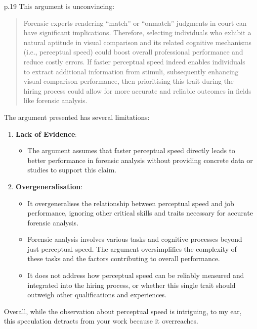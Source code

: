\documentclass[
  single column]{article}
\providecommand{\tightlist}{%
  \setlength{\itemsep}{0pt}\setlength{\parskip}{0pt}}\usepackage{longtable,booktabs,array}
\begin{document}
p.19 This argument is unconvincing:

\begin{quote}
Forensic experts rendering ``match'' or ``onmatch'' judgments in court
can have significant implications. Therefore, selecting individuals who
exhibit a natural aptitude in visual comparison and its related
cognitive mechanisms (i.e., perceptual speed) could boost overall
professional performance and reduce costly errors. If faster perceptual
speed indeed enables individuals to extract additional information from
stimuli, subsequently enhancing visual comparison performance, then
prioritising this trait during the hiring process could allow for more
accurate and reliable outcomes in fields like forensic analysis.
\end{quote}

The argument presented has several limitations:

\begin{enumerate}
\def\labelenumi{\arabic{enumi}.}
\item
  \textbf{Lack of Evidence}:

  \begin{itemize}
  \tightlist
  \item
    The argument assumes that faster perceptual speed directly leads to
    better performance in forensic analysis without providing concrete
    data or studies to support this claim.
  \end{itemize}
\item
  \textbf{Overgeneralisation}:

  \begin{itemize}
  \item
    It overgeneralises the relationship between perceptual speed and job
    performance, ignoring other critical skills and traits necessary for
    accurate forensic analysis.
  \item
    Forensic analysis involves various tasks and cognitive processes
    beyond just perceptual speed. The argument oversimplifies the
    complexity of these tasks and the factors contributing to overall
    performance.
  \item
    It does not address how perceptual speed can be reliably measured
    and integrated into the hiring process, or whether this single trait
    should outweigh other qualifications and experiences.
  \end{itemize}
\end{enumerate}

Overall, while the observation about perceptual speed is intriguing, to
my ear, this speculation detracts from your work because it overreaches.
\end{document}
